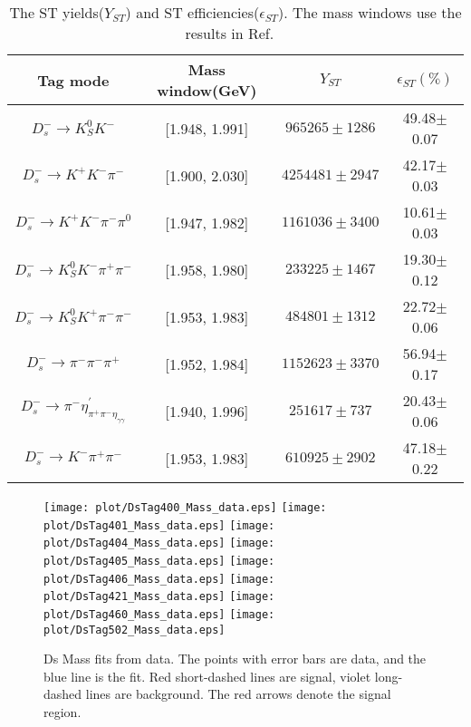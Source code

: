 \begin{table}[htbp]
    \caption{ The ST yields($Y_{ST}$) and ST efficiencies($\epsilon_{ST}$). The mass windows use the results in Ref. ~\cite{Doc-DB-630-v35} }
    \label{ST-eff}
    \begin{center}
        \begin{tabular}{cccc}
            \toprule\toprule
            Tag mode & Mass window(GeV)  & $Y_{ST}$  & $\epsilon_{ST}(\%)$\\
            \hline
            $D_{s}^{-} \rightarrow K_{S}^{0}K^{-}$                          & [1.948, 1.991]    & $965265\pm1286$               & 49.48$\pm$0.07\\
            $D_{s}^{-} \rightarrow K^{+}K^{-}\pi^{-}$                       & [1.900, 2.030]    & $4254481\pm2947$              & 42.17$\pm$0.03\\
            $D_{s}^{-} \rightarrow K^{+}K^{-}\pi^{-}\pi^{0}$                & [1.947, 1.982]    & $1161036\pm3400$              & 10.61$\pm$0.03\\
            $D_{s}^{-} \rightarrow K_{S}^{0}K^{-}\pi^{+}\pi^{-}$            & [1.958, 1.980]    & $233225\pm1467$               & 19.30$\pm$0.12\\
            $D_{s}^{-} \rightarrow K_{S}^{0}K^{+}\pi^{-}\pi^{-}$            & [1.953, 1.983]    & $484801\pm1312$               & 22.72$\pm$0.06\\
            $D_{s}^{-} \rightarrow \pi^{-}\pi^{-}\pi^{+}$                   & [1.952, 1.984]    & $1152623\pm3370$              & 56.94$\pm$0.17\\
            $D_{s}^{-} \rightarrow \pi^{-}\eta_{\pi^{+}\pi^{-}\eta_{\gamma\gamma}}^{'}$          & [1.940, 1.996]    & $251617\pm737$               & 20.43$\pm$0.06\\
            $D_{s}^{-} \rightarrow K^{-}\pi^{+}\pi^{-}$                     & [1.953, 1.983]    & $610925\pm2902$               & 47.18$\pm$0.22\\
            \bottomrule\bottomrule
        \end{tabular}
    \end{center}
\end{table}

\begin{figure*}[!htbp]
 \centering
 \texttt{[image: plot/DsTag400\_Mass\_data.eps]}
 \texttt{[image: plot/DsTag401\_Mass\_data.eps]}
 \texttt{[image: plot/DsTag404\_Mass\_data.eps]}
 \texttt{[image: plot/DsTag405\_Mass\_data.eps]}
 \texttt{[image: plot/DsTag406\_Mass\_data.eps]}
 \texttt{[image: plot/DsTag421\_Mass\_data.eps]}
 \texttt{[image: plot/DsTag460\_Mass\_data.eps]}
 \texttt{[image: plot/DsTag502\_Mass\_data.eps]}
 \caption{Ds Mass fits from data. The points with error bars are data, and the blue line is the fit. Red short-dashed lines are signal, violet long-dashed lines are background. The red arrows denote the signal region.  }
\label{SingleTagFit}
\end{figure*}


